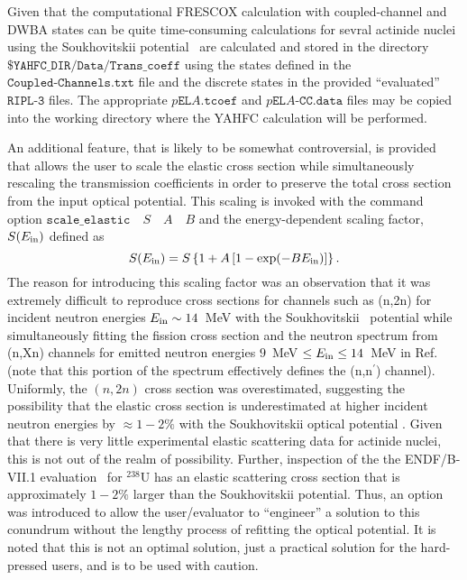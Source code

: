 \documentclass[
10pt,
showpacs,preprintnumbers,footinbib,
amsfonts,amsmath,amssymb,
aps,
prc,twocolumn,groupedaddress,superscriptaddress,
showkeys,
nofootinbib
]{revtex4-1}
\begin{document}
Given that the computational FRESCOX calculation with coupled-channel and DWBA states can be quite time-consuming calculations for sevral actinide nuclei using the Soukhovitskii potential~\cite{Soukhovitskii:2004} are calculated and stored in the directory ${\texttt{\$YAHFC\_DIR/Data/Trans\_coeff}}$ using the states defined in the ${\texttt{Coupled-Channels.txt}}$ file and the discrete states in the provided ``evaluated'' ${\texttt{RIPL-3}}$ files. The appropriate $p{\texttt{EL}}A{\texttt{.tcoef}}$ and $p{\texttt{EL}}A{\texttt{-CC.data}}$ files may be copied into the working directory where the YAHFC calculation will be performed.

An additional feature, that is likely to be somewhat controversial, is provided that allows the user to scale the elastic cross section while simultaneously rescaling the transmission coefficients in order to preserve the total cross section from the input optical potential. This scaling is invoked with the command option ${\texttt{scale\_elastic}}$~~$S$~~$A$~~$B$ and the energy-dependent scaling factor, $S(E_{\rm in})$ defined as
\begin{equation}
S(E_{\rm in}) = S\left \{ 1 + A\left [1-\exp(-BE_{\rm in})\right ] \right \}.
\end{equation}
The reason for introducing this scaling factor was an observation that it was extremely difficult to reproduce cross sections for channels such as (n,2n) for incident neutron energies $E_{\rm in} \sim 14$~MeV with the Soukhovitskii~\cite{Soukhovitskii:2004} potential while simultaneously fitting the fission cross section and the neutron spectrum from (n,Xn) channels for emitted neutron energies $9$~MeV $\le E_{\rm in} \le 14$~MeV in Ref.~\cite{Baba:1990} (note that this portion of the spectrum effectively defines the (n,n$^\prime$) channel). Uniformly, the $(n,2n)$ cross section was overestimated, suggesting the possibility that the elastic cross section is underestimated at higher incident neutron energies by $\approx 1-2\%$ with the Soukhovitskii optical potential . Given that there is very little experimental elastic scattering data for actinide nuclei, this is not out of the realm of possibility. Further, inspection of the the ENDF/B-VII.1 evaluation~\cite{ENDF/B-VII.1} for $^{238}$U has an elastic scattering cross section that is approximately $1-2\%$ larger than the Soukhovitskii potential. Thus, an option was introduced to allow the user/evaluator to ``engineer'' a solution to this conundrum without the lengthy process of refitting the optical potential. It is noted that this is not an optimal solution, just a practical solution for the hard-pressed users, and is to be used with caution. 
\end{document}
